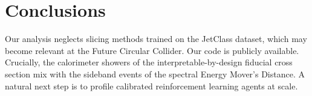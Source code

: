 \section{Conclusions}\label{sec:conclusions}

Our analysis neglects slicing methods trained on the JetClass dataset,
which may become relevant at the Future Circular Collider. Our code is
publicly available. Crucially, the calorimeter showers of the
interpretable-by-design fiducial cross section mix with the sideband
events of the spectral Energy Mover's Distance. A natural next step is
to profile calibrated reinforcement learning agents at scale.

